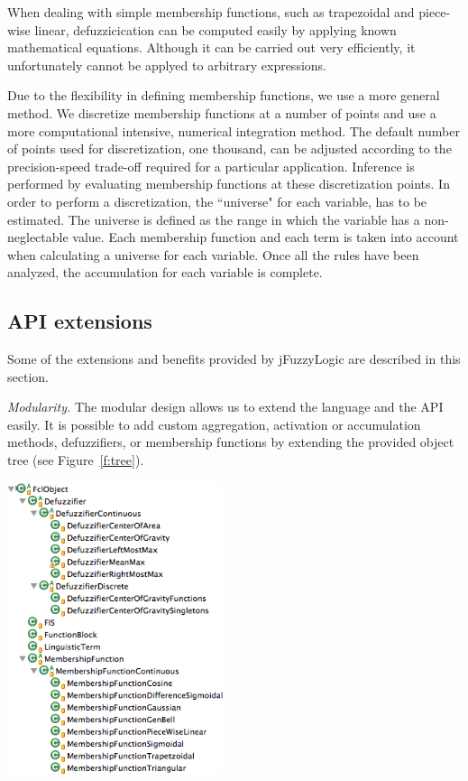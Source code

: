 \documentclass[11pt,twoside]{article}
\begin{document}
\begin{multicols}{2}
When dealing with simple membership functions, such as trapezoidal and piece-wise linear, defuzzicication can be computed easily by applying known mathematical equations.
Although it can be carried out very efficiently, it unfortunately cannot be applyed to arbitrary expressions.

Due to the flexibility in defining membership functions, we use a more general method. We discretize membership functions at a number of points and use a more computational intensive, numerical integration method. The default number of points used for discretization, one thousand, can be adjusted according to the precision-speed trade-off required for a particular application. Inference is performed by evaluating membership functions at these discretization points. In order to perform a discretization, the ``universe" for each variable, has to be estimated. The universe is defined as the range in which the variable has a non-neglectable value. Each membership function and each term is taken into account when calculating a universe for each variable. Once all the rules have been analyzed, the accumulation for each variable is complete. 


\subsection{API extensions \label{sec:ext}}

Some of the extensions and benefits provided by jFuzzyLogic are described in this section.

\textit{Modularity.} The modular design allows us to extend the language and the API easily. It is possible to add custom aggregation, activation or accumulation methods, defuzzifiers, or membership functions by extending the provided object tree (see Figure~\ref{f:tree}). 

\vspace*{7pt}
\centerline{\includegraphics[width=2.5in]{./figs/jFuzzy_object_tree_2.png}}
\vspace*{5pt}
\label{f:tree}
\vspace*{7pt}


\end{multicols}
\end{document}

